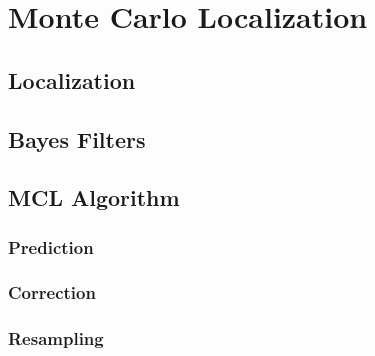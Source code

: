\chapter{Monte Carlo Localization}

\section{Localization}

\section{Bayes Filters}

\section{MCL Algorithm}

\subsection{Prediction}
\subsection{Correction}
\subsection{Resampling}
